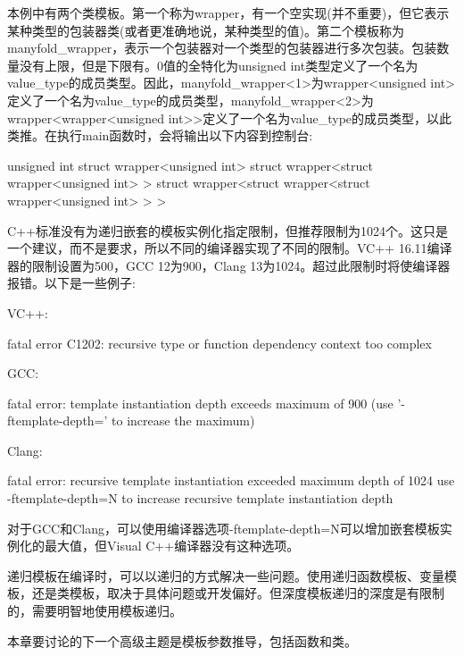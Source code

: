 本例中有两个类模板。第一个称为wrapper，有一个空实现(并不重要)，但它表示某种类型的包装器类(或者更准确地说，某种类型的值)。第二个模板称为manyfold\_wrapper，表示一个包装器对一个类型的包装器进行多次包装。包装数量没有上限，但是下限有。0值的全特化为unsigned int类型定义了一个名为value\_type的成员类型。因此，manyfold\_wrapper<1>为wrapper<unsigned int>定义了一个名为value\_type的成员类型，manyfold\_wrapper<2>为wrapper<wrapper<unsigned int>>定义了一个名为value\_type的成员类型，以此类推。在执行main函数时，会将输出以下内容到控制台:

\begin{cpp}
unsigned int
struct wrapper<unsigned int>
struct wrapper<struct wrapper<unsigned int> >
struct wrapper<struct wrapper<struct wrapper<unsigned int> > >
\end{cpp}

C++标准没有为递归嵌套的模板实例化指定限制，但推荐限制为1024个。这只是一个建议，而不是要求，所以不同的编译器实现了不同的限制。VC++ 16.11编译器的限制设置为500，GCC 12为900，Clang 13为1024。超过此限制时将使编译器报错。以下是一些例子:

VC++:

\begin{shell}
fatal error C1202: recursive type or function dependency
context too complex
\end{shell}

GCC:

\begin{shell}
fatal error: template instantiation depth exceeds maximum of
900 (use '-ftemplate-depth=' to increase the maximum)
\end{shell}

Clang:

\begin{shell}
fatal error: recursive template instantiation exceeded maximum
depth of 1024
use -ftemplate-depth=N to increase recursive template
instantiation depth
\end{shell}

对于GCC和Clang，可以使用编译器选项-ftemplate-depth=N可以增加嵌套模板实例化的最大值，但Visual C++编译器没有这种选项。

递归模板在编译时，可以以递归的方式解决一些问题。使用递归函数模板、变量模板，还是类模板，取决于具体问题或开发偏好。但深度模板递归的深度是有限制的，需要明智地使用模板递归。

本章要讨论的下一个高级主题是模板参数推导，包括函数和类。





